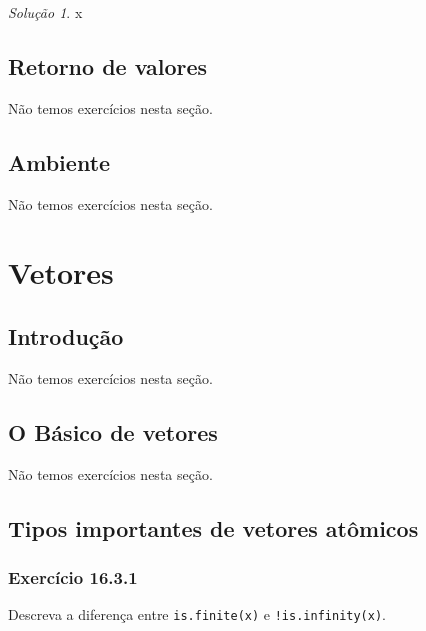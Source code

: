 \documentclass[
]{latex/krantz}
\theoremstyle{definition}
\theoremstyle{definition}
\theoremstyle{definition}
\theoremstyle{definition}
\theoremstyle{remark}
\newtheorem*{solution}{Solução}
\begin{document}
\begin{solution}
x
\end{solution}

\hypertarget{retorno-de-valores}{%
\section{Retorno de valores}\label{retorno-de-valores}}

Não temos exercícios nesta seção.

\hypertarget{ambiente}{%
\section{Ambiente}\label{ambiente}}

Não temos exercícios nesta seção.

\hypertarget{vetores}{%
\chapter{Vetores}\label{vetores}}

\hypertarget{introduuxe7uxe3o-12}{%
\section{Introdução}\label{introduuxe7uxe3o-12}}

Não temos exercícios nesta seção.

\hypertarget{o-buxe1sico-de-vetores}{%
\section{O Básico de vetores}\label{o-buxe1sico-de-vetores}}

Não temos exercícios nesta seção.

\hypertarget{tipos-importantes-de-vetores-atuxf4micos}{%
\section{Tipos importantes de vetores atômicos}\label{tipos-importantes-de-vetores-atuxf4micos}}

\hypertarget{exr16-3-1}{%
\subsection*{Exercício 16.3.1}\label{exr16-3-1}}

Descreva a diferença entre \texttt{is.finite(x)} e \texttt{!is.infinity(x)}.
\end{document}
